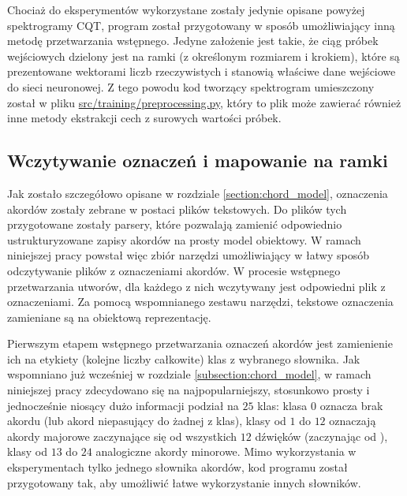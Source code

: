 Chociaż do eksperymentów wykorzystane zostały jedynie opisane powyżej spektrogramy CQT, program
został przygotowany w sposób umożliwiający inną metodę przetwarzania wstępnego. Jedyne założenie
jest takie, że ciąg próbek wejściowych dzielony jest na ramki (z określonym rozmiarem i krokiem),
które są prezentowane wektorami liczb rzeczywistych i stanowią właściwe dane wejściowe do sieci
neuronowej. Z tego powodu kod tworzący spektrogram umieszczony został w pliku
\url{src/training/preprocessing.py}, który to plik może zawierać również inne metody ekstrakcji cech
z surowych wartości próbek.

\subsection{Wczytywanie oznaczeń i mapowanie na ramki}

Jak zostało szczegółowo opisane w rozdziale \ref{section:chord_model}, oznaczenia akordów zostały zebrane w
postaci plików tekstowych. Do plików tych przygotowane zostały parsery, które pozwalają zamienić
odpowiednio ustrukturyzowane zapisy akordów na prosty model obiektowy. W ramach niniejszej pracy
powstał więc zbiór narzędzi umożliwiający w łatwy sposób odczytywanie plików z oznaczeniami akordów.
W procesie wstępnego przetwarzania utworów, dla każdego z nich wczytywany jest odpowiedni plik z
oznaczeniami. Za pomocą wspomnianego zestawu narzędzi, tekstowe oznaczenia zamieniane są na obiektową
reprezentację.

Pierwszym etapem wstępnego przetwarzania oznaczeń akordów jest zamienienie ich na etykiety (kolejne
liczby całkowite) klas z wybranego słownika. Jak wspomniano już wcześniej w rozdziale
\ref{subsection:chord_model}, w ramach niniejszej pracy zdecydowano się na najpopularniejszy,
stosunkowo prosty i jednocześnie niosący dużo informacji podział na $25$ klas: klasa $0$ oznacza
brak akordu (lub akord niepasujący do żadnej z klas), klasy od $1$ do $12$ oznaczają akordy majorowe
zaczynające się od wszystkich $12$ dźwięków (zaczynając od ), klasy od $13$ do $24$
analogiczne akordy minorowe. Mimo wykorzystania w eksperymentach tylko jednego słownika akordów, kod
programu został przygotowany tak, aby umożliwić łatwe wykorzystanie innych słowników.

